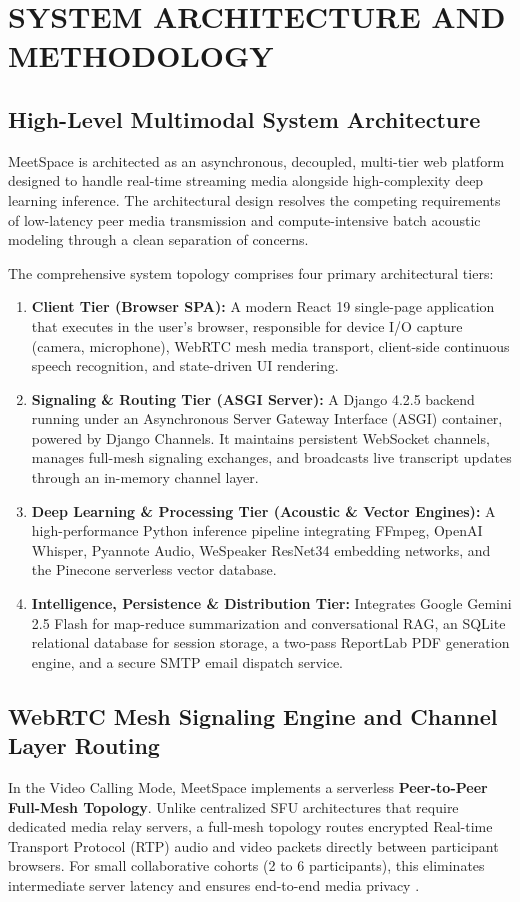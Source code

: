 \documentclass[12pt,oneside,letterpaper]{report}
\numberwithin{equation}{chapter} %
\begin{document}
\chapter{SYSTEM ARCHITECTURE AND METHODOLOGY}

\section{High-Level Multimodal System Architecture}
MeetSpace is architected as an asynchronous, decoupled, multi-tier web platform designed to handle real-time streaming media alongside high-complexity deep learning inference. The architectural design resolves the competing requirements of low-latency peer media transmission and compute-intensive batch acoustic modeling through a clean separation of concerns.

The comprehensive system topology comprises four primary architectural tiers:
\begin{enumerate}
    \item \textbf{Client Tier (Browser SPA):} A modern React 19 single-page application that executes in the user's browser, responsible for device I/O capture (camera, microphone), WebRTC mesh media transport, client-side continuous speech recognition, and state-driven UI rendering.
    \item \textbf{Signaling \& Routing Tier (ASGI Server):} A Django 4.2.5 backend running under an Asynchronous Server Gateway Interface (ASGI) container, powered by Django Channels. It maintains persistent WebSocket channels, manages full-mesh signaling exchanges, and broadcasts live transcript updates through an in-memory channel layer.
    \item \textbf{Deep Learning \& Processing Tier (Acoustic \& Vector Engines):} A high-performance Python inference pipeline integrating FFmpeg, OpenAI Whisper, Pyannote Audio, WeSpeaker ResNet34 embedding networks, and the Pinecone serverless vector database.
    \item \textbf{Intelligence, Persistence \& Distribution Tier:} Integrates Google Gemini 2.5 Flash for map-reduce summarization and conversational RAG, an SQLite relational database for session storage, a two-pass ReportLab PDF generation engine, and a secure SMTP email dispatch service.
\end{enumerate}

\section{WebRTC Mesh Signaling Engine and Channel Layer Routing}
In the Video Calling Mode, MeetSpace implements a serverless \textbf{Peer-to-Peer Full-Mesh Topology}. Unlike centralized SFU architectures that require dedicated media relay servers, a full-mesh topology routes encrypted Real-time Transport Protocol (RTP) audio and video packets directly between participant browsers. For small collaborative cohorts (2 to 6 participants), this eliminates intermediate server latency and ensures end-to-end media privacy \cite{subbiah2022performance}.
\end{document}
